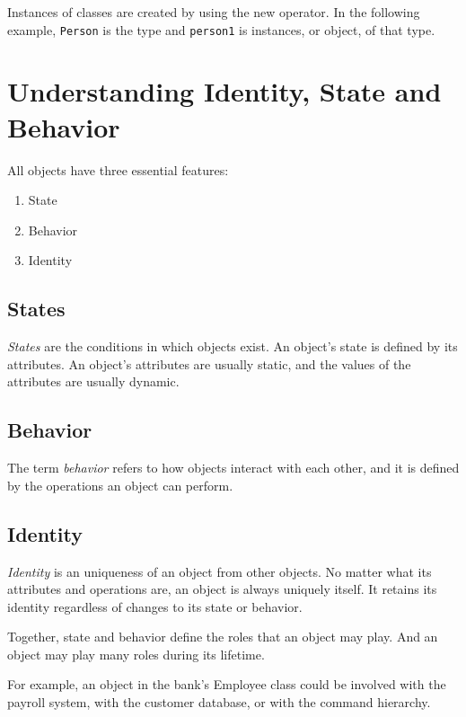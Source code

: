 Instances of classes are created by using the new operator. In the following example, \texttt{Person} is the type and \texttt{person1} is instances, or object, of that type.






\section{Understanding Identity, State and Behavior}
All objects have three essential features:

\begin{multicols}{3}
\begin{enumerate}
	\item State
	\item Behavior
	\item Identity
\end{enumerate}
\end{multicols}


\subsection*{States}
\textit{States} are the conditions in which objects exist. An object's state is defined by its
attributes. An object's attributes are usually static, and the values of the attributes are
usually dynamic.

\subsection*{Behavior}
The term \textit{behavior} refers to how objects interact with each other, and it is defined by the
operations an object can perform.

\subsection*{Identity}
\textit{Identity} is an uniqueness of an object from other objects. No matter what its attributes and operations are, an object is always uniquely itself. It retains its identity regardless of changes to its state or behavior.

Together, state and behavior define the roles that an object may play. And an object may play many roles during its lifetime.

For example, an object in the bank's Employee class could be involved with the payroll
system, with the customer database, or with the command hierarchy.

